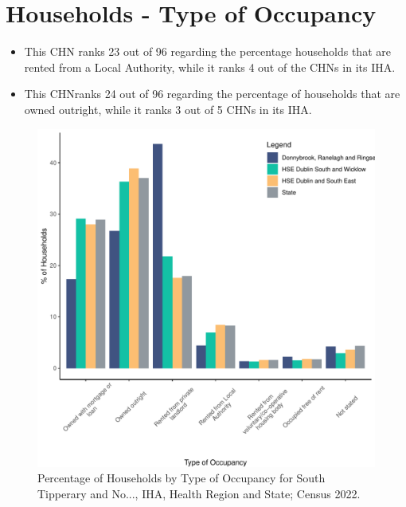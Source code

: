 \documentclass{article}
\begin{document}
\section{Households - Type of Occupancy}\label{sect:Households}
\begin{itemize}
\item This CHN ranks  23 out of 96 regarding the percentage households that are rented from a Local Authority, while it ranks  4 out of the CHNs in its IHA. 
\item This CHNranks  24 out of 96 regarding the percentage of households that are owned outright, while it ranks   3 out of 5 CHNs in its IHA.
\end{itemize}
\begin{figure}[H]
	\centering
	\includegraphics[width = 140mm]{../figures/HouseholdsED.pdf}
	\caption{Percentage of Households by Type of Occupancy for South Tipperary and No..., IHA, Health Region and State; Census 2022.}
	\label{fig:vbnv}
	\end{figure}
\end{document}
